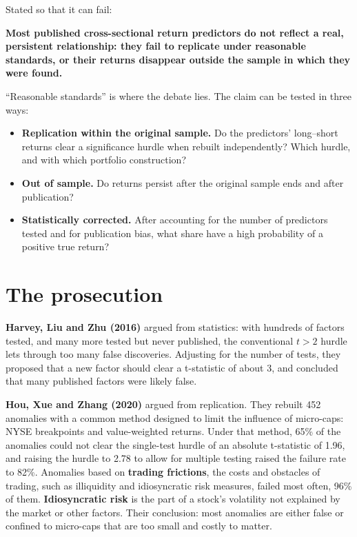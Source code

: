 Stated so that it can fail:

\begin{callout}
\textbf{Most published cross-sectional return predictors do not reflect a real, persistent relationship: they fail to replicate under reasonable standards, or their returns disappear outside the sample in which they were found.}
\end{callout}

``Reasonable standards'' is where the debate lies. The claim can be tested in three ways:

\begin{itemize}
  \item \textbf{Replication within the original sample.} Do the predictors' long--short returns clear a significance hurdle when rebuilt independently? Which hurdle, and with which portfolio construction?
  \item \textbf{Out of sample.} Do returns persist after the original sample ends and after publication?
  \item \textbf{Statistically corrected.} After accounting for the number of predictors tested and for publication bias, what share have a high probability of a positive true return?
\end{itemize}

\section{The prosecution}
\label{sec:07-prosecution}

\textbf{Harvey, Liu and Zhu (2016)} argued from statistics: with hundreds of factors tested, and many more tested but never published, the conventional $t > 2$ hurdle lets through too many false discoveries. Adjusting for the number of tests, they proposed that a new factor should clear a t-statistic of about 3, and concluded that many published factors were likely false.

\textbf{Hou, Xue and Zhang (2020)} argued from replication. They rebuilt 452 anomalies with a common method designed to limit the influence of micro-caps: NYSE breakpoints and value-weighted returns. Under that method, 65\% of the anomalies could not clear the single-test hurdle of an absolute t-statistic of 1.96, and raising the hurdle to 2.78 to allow for multiple testing raised the failure rate to 82\%. Anomalies based on \textbf{trading frictions}, the costs and obstacles of trading, such as illiquidity and idiosyncratic risk measures, failed most often, 96\% of them. \textbf{Idiosyncratic risk} is the part of a stock's volatility not explained by the market or other factors. Their conclusion: most anomalies are either false or confined to micro-caps that are too small and costly to matter.

